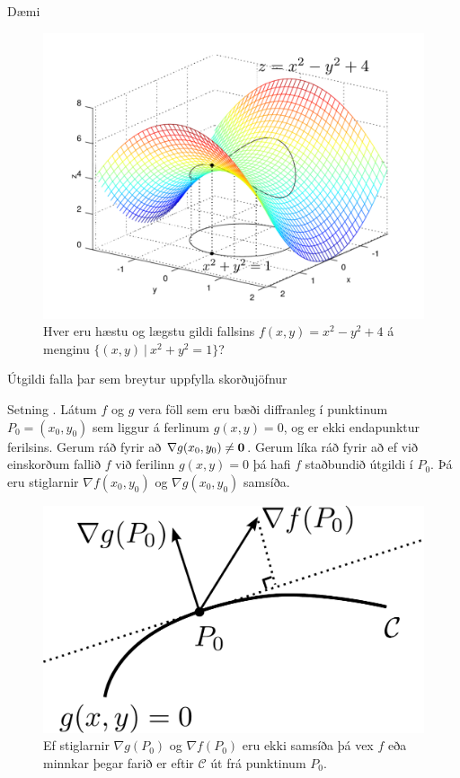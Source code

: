 \begin {frame}{Dæmi}
 \begin {figure}[h!]
 \centering
            \includegraphics[width=.7\linewidth]{constraint.pdf}
            \caption*{Hver eru hæstu og lægstu gildi fallsins $f(x,y) = x^2-y^2+4$ á menginu $\{(x,y)~|~x^2+y^2=1\}$?}
\end {figure}
\end {frame}



 


\begin{frame}{Útgildi falla þar sem breytur uppfylla skorðujöfnur} 

\begin {block}{Setning \kaflanr.}
Látum $f$ og $g$ vera föll sem eru bæði
diffranleg í punktinum $P_0=(x_0,y_0)$ sem liggur á ferlinum
$g(x,y)=0$, og er ekki endapunktur ferilsins.  Gerum ráð fyrir að
$\nabla g(x_0,y_0)\neq \mbox{${\bf 0}$}$.  Gerum líka ráð fyrir að ef við einskorðum fallið $f$ við ferilinn $g(x,y)=0$ þá hafi $f$ staðbundið útgildi í $P_0$.  Þá eru stiglarnir $\nabla f(x_0,y_0)$ og $\nabla g(x_0,y_0)$ samsíða.
\end{block}
\end {frame}
\begin {frame}
\begin {figure}[h!]
 \centering
            \includegraphics[width=.4\linewidth]{lagrange1}
            \caption*{Ef stiglarnir $\nabla g(P_0)$ og $\nabla f(P_0)$ eru ekki samsíða þá vex $f$ eða minnkar þegar farið er eftir $\mathcal{C}$ út frá punktinum $P_0$.}
\end {figure}
\end{frame}


